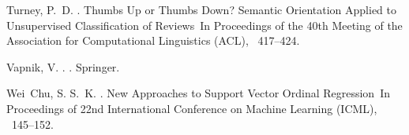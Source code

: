 \documentclass[japanese]{jnlp_1.3d}
\begin{document}
\begin{thebibliography}{}
Turney, P.~D. \BBCP.
\newblock \BBOQ Thumbs Up or Thumbs Down? Semantic Orientation Applied to
  Unsupervised Classification of Reviews\BBCQ\
\newblock In {\Bem Proceedings of the 40th Meeting of the Association for
  Computational Linguistics (ACL)}, \mbox{\BPGS\ 417--424}.

Vapnik, V. \BBCP.
.
\newblock Springer.

Wei~Chu, S. S.~K. \BBCP.
\newblock \BBOQ New Approaches to Support Vector Ordinal Regression\BBCQ\
\newblock In {\Bem Proceedings of 22nd International Conference on Machine
  Learning (ICML)}, \mbox{\BPGS\ 145--152}.

\end{thebibliography}




\begin{biography}



\end{biography}



\biodate
\end{document}
